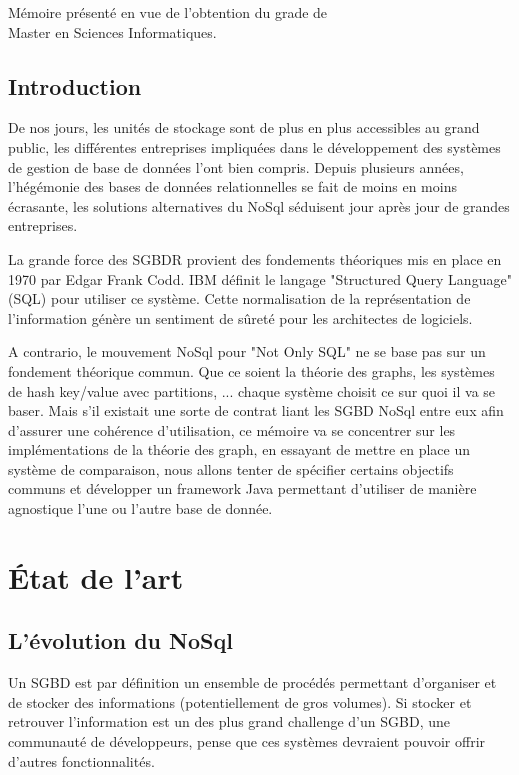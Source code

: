 \documentclass[a4paper,fleqn,12pt]{report}
\begin{document}
\vspace{0.5cm}
\begin{center}
M\'emoire pr\'esent\'e en vue de l'obtention du grade de\\
Master en Sciences Informatiques.
\end{center}
\tableofcontents
\newpage


\chapter*{Introduction}

De nos jours, les unités de stockage sont de plus en plus accessibles au grand public, les différentes entreprises impliquées dans le développement des systèmes de gestion de base de données l'ont bien compris. Depuis plusieurs années, l'hégémonie des bases de données relationnelles se fait de moins en moins écrasante, les solutions alternatives du NoSql séduisent jour après jour de grandes entreprises. 

La grande force des SGBDR provient des fondements théoriques mis en place en 1970 par Edgar Frank Codd. IBM définit le langage "Structured Query Language" (SQL) pour utiliser ce système. Cette normalisation de la représentation de l'information génère un sentiment de sûreté pour les architectes de logiciels.

A contrario, le mouvement NoSql pour "Not Only SQL" ne se base pas sur un fondement théorique commun. Que ce soient la théorie des graphs, les systèmes de hash key/value avec partitions, ... chaque système choisit ce sur quoi il va se baser. Mais s'il existait une sorte de contrat liant les SGBD NoSql entre eux afin d'assurer une cohérence d'utilisation, ce mémoire va se concentrer sur les implémentations de la théorie des graph, en essayant de mettre en place un système de comparaison, nous allons tenter de spécifier certains objectifs communs et développer un framework Java permettant d'utiliser de manière agnostique l'une ou l'autre base de donnée.
 
\part{État de l'art}

\chapter{L'évolution du NoSql}
\label{NoSqlEvol}

Un SGBD est par définition un ensemble de procédés permettant d'organiser et de stocker des informations (potentiellement de gros volumes). Si stocker et retrouver l'information est un des plus grand challenge d'un SGBD, une communauté de développeurs, pense que ces systèmes devraient pouvoir offrir d'autres fonctionnalités. 
\end{document}
